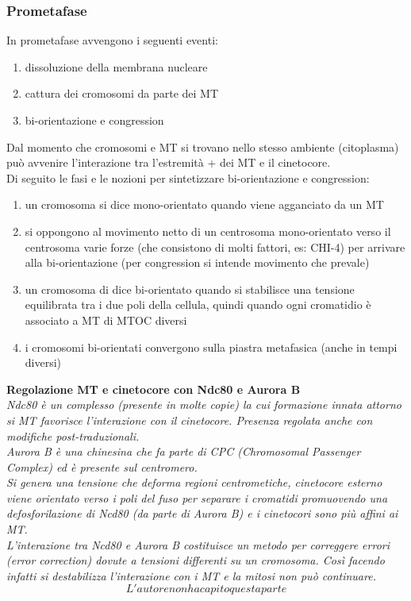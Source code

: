         \subsubsection{Prometafase}
            In prometafase avvengono i seguenti eventi:
            \begin{enumerate}
                \item dissoluzione della membrana nucleare
                \item cattura dei cromosomi da parte dei MT
                \item bi-orientazione e congression
            \end{enumerate}
            Dal momento che cromosomi e MT si trovano nello stesso ambiente (citoplasma) può avvenire l’interazione tra l’estremità + dei MT e il cinetocore.\\
            Di seguito le fasi e le nozioni per sintetizzare bi-orientazione e congression:
            \begin{enumerate}
                \item un cromosoma si dice mono-orientato quando viene agganciato da un MT
                \item si oppongono al movimento netto di un centrosoma mono-orientato verso il centrosoma varie forze (che consistono di molti fattori, es: CHI-4) per arrivare alla bi-orientazione (per congression si intende movimento che prevale)
                \item un cromosoma di dice bi-orientato quando si stabilisce una tensione equilibrata tra i due poli della cellula, quindi quando ogni cromatidio è associato a MT di MTOC diversi
                \item i cromosomi bi-orientati convergono sulla piastra metafasica (anche in tempi diversi)
            \end{enumerate}
            
            \textbf{Regolazione MT e cinetocore con Ndc80 e Aurora B}\\
            \textit{Ndc80 è un complesso (presente in molte copie) la cui formazione innata attorno si MT favorisce l’interazione con il cinetocore. Presenza regolata anche con modifiche post-traduzionali.\\
            Aurora B è una chinesina che fa parte di CPC (Chromosomal Passenger Complex) ed è presente sul centromero. \\
            Si genera una tensione che deforma regioni centrometiche, cinetocore esterno viene orientato verso i poli del fuso per separare i cromatidi promuovendo una defosforilazione di Ncd80 (da parte di Aurora B) e i cinetocori sono più affini ai MT.\\
            L’interazione tra Ncd80 e Aurora B costituisce un metodo per correggere errori (error correction) dovute a tensioni differenti su un cromosoma. Così facendo infatti si destabilizza l’interazione con i MT e la mitosi non può continuare.\\
            \[L'autore non ha capito questa parte\]}
